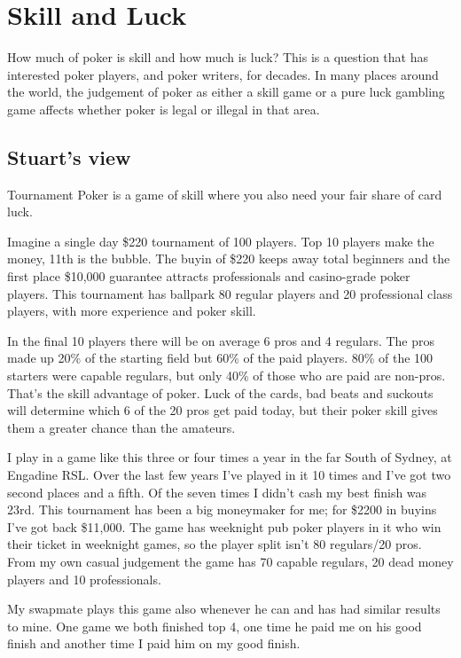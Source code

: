 \chapter{Skill and Luck}

How much of poker is skill and how much is luck? This is a question
that has interested poker players, and poker writers, for decades.
In many places around the world, the judgement of poker as either a
skill game or a pure luck gambling game affects whether poker is legal
or illegal in that area.

\section{Stuart's view}

Tournament Poker is a game of skill where you also need your fair
share of card luck.

Imagine a single day \$220 tournament of 100 players. Top 10
players make the money, 11th is the bubble. The buyin of
\$220 keeps away total beginners and the first place \$10,000
guarantee attracts professionals and casino-grade poker players.
This tournament has ballpark 80 regular players and 20 professional
class players, with more experience and poker skill.

In the final 10 players there will be on average 6 pros and 4
regulars. The pros made up 20\% of the starting field but 60\% of
the paid players. 80\% of the 100 starters were capable regulars, but
only 40\% of those who are paid are non-pros. That's the skill
advantage of poker. Luck of the cards, bad beats and suckouts will
determine which 6 of the 20 pros get paid today, but their poker skill
gives them a greater chance than the amateurs.

I play in a game like this three or four times a year in the far
South of Sydney, at Engadine RSL. Over the last few years I've played
in it 10 times and I've got two second places and a fifth. Of the
seven times I didn't cash my best finish was 23rd. This tournament has
been a big moneymaker for me; for \$2200 in buyins I've got back
\$11,000. The game has weeknight pub poker players in it who win their
ticket in weeknight games, so the player split isn't 80 regulars/20 pros.
From my own casual judgement the game has 70 capable regulars, 20 dead
money players and 10 professionals.

My swapmate plays this game also whenever he can and has had similar
results to mine. One game we both finished top 4, one time he paid
me on his good finish and another time I paid him on my good finish.


